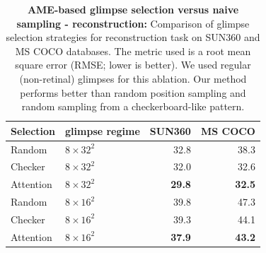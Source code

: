 \begin{table}[t]
\begin{center}
\begin{small}
\begin{sc}
\begin{tabular}{llrr}
\toprule
Selection & glimpse regime & SUN360 & MS COCO \\
\midrule
Random & $8 \times 32^2$ & 32.8 & 38.3 \\
Checker & $8 \times 32^2$ & 32.0 & 32.6 \\
Attention & $8 \times 32^2$ & \textbf{29.8} & \textbf{32.5} \\
\midrule
Random & $8 \times 16^2$ & 39.8 & 47.3\\
Checker & $8 \times 16^2$ & 39.3 & 44.1 \\
Attention & $8 \times 16^2$ & \textbf{37.9} & \textbf{43.2} \\
\bottomrule
\end{tabular}
\end{sc}
\end{small}
\end{center}
\vskip -0.1in
\caption{\textbf{AME-based glimpse selection versus naive sampling - reconstruction:} Comparison of glimpse selection strategies for reconstruction task on SUN360 and MS COCO databases. The metric used is a root mean square error (RMSE; lower is better). We used regular (non-retinal) glimpses for this ablation. Our method performs better than random position sampling and random sampling from a checkerboard-like pattern.}
\label{tab:selection-reconstruction}
\end{table}